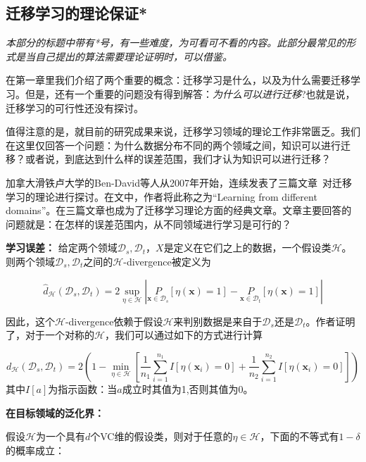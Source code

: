 \subsection{迁移学习的理论保证*}
\textit{
本部分的标题中带有*号，有一些难度，为可看可不看的内容。此部分最常见的形式是当自己提出的算法需要理论证明时，可以借鉴。}

在第一章里我们介绍了两个重要的概念：迁移学习是什么，以及为什么需要迁移学习。但是，还有一个重要的问题没有得到解答：\textit{为什么可以进行迁移}?也就是说，迁移学习的可行性还没有探讨。

值得注意的是，就目前的研究成果来说，迁移学习领域的理论工作非常匮乏。我们在这里仅回答一个问题：为什么数据分布不同的两个领域之间，知识可以进行迁移？或者说，到底达到什么样的误差范围，我们才认为知识可以进行迁移？

加拿大滑铁卢大学的Ben-David等人从2007年开始，连续发表了三篇文章~\cite{ben2007analysis,blitzer2008learning,ben2010theory}对迁移学习的理论进行探讨。在文中，作者将此称之为“Learning from different domains”。在三篇文章也成为了迁移学习理论方面的经典文章。文章主要回答的问题就是：在怎样的误差范围内，从不同领域进行学习是可行的？

\textbf{学习误差：} 给定两个领域$\mathcal{D}_s,\mathcal{D}_t$，$X$是定义在它们之上的数据，一个假设类$\mathcal{H}$。则两个领域$\mathcal{D}_s,\mathcal{D}_t$之间的$\mathcal{H}$-divergence被定义为

\begin{equation}
	\hat{d}_{\mathcal{H}}(\mathcal{D}_s,\mathcal{D}_t) = 2 \sup_{\eta \in \mathcal{H}} \left|\underset{\mathbf{x} \in \mathcal{D}_s}{P}[\eta(\mathbf{x}) = 1] - \underset{\mathbf{x} \in \mathcal{D}_t}{P}[\eta(\mathbf{x}) = 1] \right|
\end{equation}

因此，这个$\mathcal{H}$-divergence依赖于假设$\mathcal{H}$来判别数据是来自于$\mathcal{D}_s$还是$\mathcal{D}_t$。作者证明了，对于一个对称的$\mathcal{H}$，我们可以通过如下的方式进行计算

\begin{equation}
	d_\mathcal{H} (\mathcal{D}_s,\mathcal{D}_t) = 2 \left(1 - \min_{\eta \in \mathcal{H}} \left[\frac{1}{n_1} \sum_{i=1}^{n_1} I[\eta(\mathbf{x}_i)=0] + \frac{1}{n_2} \sum_{i=1}^{n_2} I[\eta(\mathbf{x}_i)=0]\right] \right)
\end{equation}
其中$I[a]$为指示函数：当$a$成立时其值为1,否则其值为0。

\textbf{在目标领域的泛化界：}

假设$\mathcal{H}$为一个具有$d$个VC维的假设类，则对于任意的$\eta \in \mathcal{H}$，下面的不等式有$1 - \delta$的概率成立：

